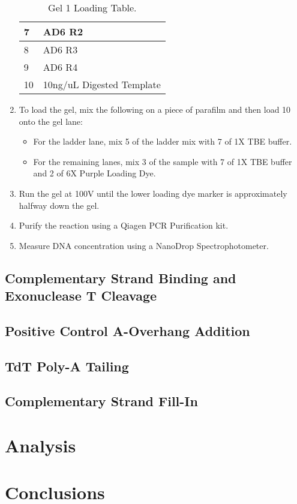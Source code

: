 \documentclass{ssiBio}
\begin{document}
\begin{enumerate}
\begin{table}[ht]
\begin{tabular}{|l|l|}
    7 & AD6 R2 \\ \hline
    8 & AD6 R3 \\ \hline
    9 & AD6 R4 \\ \hline
    10 & 10ng/uL Digested Template \\ \hline
    \end{tabular}
    \caption{\label{tab:gel-1-table}Gel 1 Loading Table.}
    \end{table}
  \item{To load the gel, mix the following on a piece of parafilm and then load 10\uL{} onto the gel lane:}
  \begin{itemize}
    \item{For the ladder lane, mix 5\uL{} of the ladder mix with 7\uL{} of 1X TBE buffer.}
    \item{For the remaining lanes, mix 3\uL{} of the sample with 7\uL{} of 1X TBE buffer and 2\uL{} of 6X Purple Loading Dye.}
  \end{itemize}
  \item{Run the gel at 100V until the lower loading dye marker is approximately halfway down the gel.}
  \stopPoint{}
  \item{Purify the reaction using a Qiagen PCR Purification kit.}
  \item{Measure DNA concentration using a NanoDrop Spectrophotometer.}
  \stopPoint{}
\end{enumerate}

\subsection{Complementary Strand Binding and Exonuclease T Cleavage}

\subsection{Positive Control A-Overhang Addition}

\subsection{TdT Poly-A Tailing}

\subsection{Complementary Strand Fill-In}

\section{Analysis}

\section{Conclusions}



\end{document}
